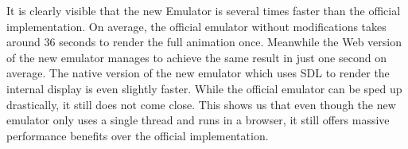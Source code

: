 It is clearly visible that the new Emulator is several times faster than the official implementation.
On average, the official emulator without modifications takes around 36 seconds to render the full animation once. Meanwhile the Web version of the new emulator manages to achieve the same result in just one second on average. The native version of the new emulator which uses SDL to render the internal display is even slightly faster. While the official emulator can be sped up drastically, it still does not come close.
This shows us that even though the new emulator only uses a single thread and runs in a browser, it still offers massive performance benefits over the official implementation.
